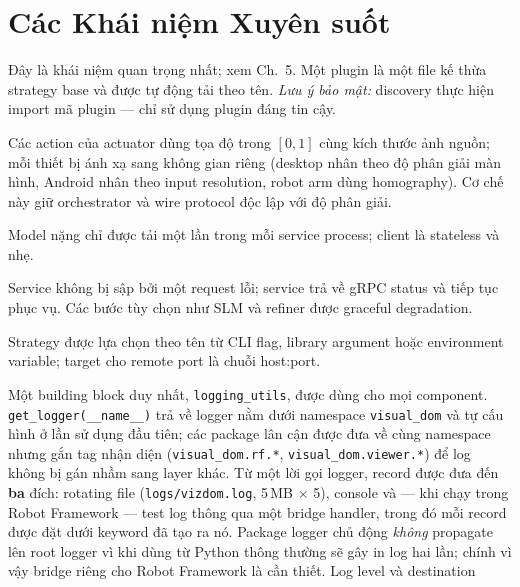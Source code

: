 \documentclass[11pt,a4paper]{report}
\newcommand{\code}[1]{\texttt{#1}}
\begin{document}
\chapter{Các Khái niệm Xuyên suốt}
\begin{description}[leftmargin=0pt,style=nextline]
  \item[Khả năng mở rộng (strategy + registry + auto-discovery)] Đây là khái niệm quan
    trọng nhất; xem Ch.~5. Một plugin là một file kế thừa strategy base và được tự động
    tải theo tên. \emph{Lưu ý bảo mật:} discovery thực hiện import mã plugin --- chỉ sử
    dụng plugin đáng tin cậy.
  \item[Hợp đồng normalized coordinate] Các action của actuator dùng tọa độ trong
    $[0,1]$ cùng kích thước ảnh nguồn; mỗi thiết bị ánh xạ sang không gian riêng
    (desktop nhân theo độ phân giải màn hình, Android nhân theo input resolution,
    robot arm dùng homography). Cơ chế này giữ orchestrator và wire protocol độc lập
    với độ phân giải.
  \item[Warm-model service] Model nặng chỉ được tải một lần trong mỗi service process;
    client là stateless và nhẹ.
  \item[Xử lý lỗi] Service không bị sập bởi một request lỗi; service trả về gRPC status
    và tiếp tục phục vụ. Các bước tùy chọn như SLM và refiner được graceful degradation.
  \item[Cấu hình] Strategy được lựa chọn theo tên từ CLI flag, library argument hoặc
    environment variable; target cho remote port là chuỗi host:port.
  \item[Logging và observability] Một building block duy nhất, \code{logging\_utils},
    được dùng cho mọi component. \code{get\_logger(\_\_name\_\_)} trả về logger nằm
    dưới namespace \code{visual\_dom} và tự cấu hình ở lần sử dụng đầu tiên; các package
    lân cận được đưa về cùng namespace nhưng gắn tag nhận diện
    (\code{visual\_dom.rf.*}, \code{visual\_dom.viewer.*}) để log không bị gán nhầm
    sang layer khác. Từ một lời gọi logger, record được đưa đến \textbf{ba} đích:
    rotating file (\code{logs/vizdom.log}, 5\,MB $\times$ 5), console và --- khi chạy
    trong Robot Framework --- test log thông qua một bridge handler, trong đó mỗi
    record được đặt dưới keyword đã tạo ra nó. Package logger chủ động \emph{không}
    propagate lên root logger vì khi dùng từ Python thông thường sẽ gây in log hai lần;
    chính vì vậy bridge riêng cho Robot Framework là cần thiết. Log level và destination

\end{description}
\end{document}

